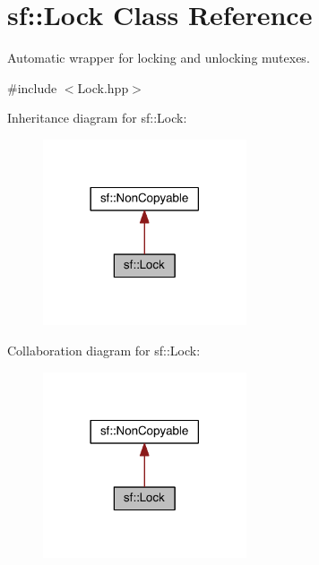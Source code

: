 \hypertarget{classsf_1_1_lock}{\section{sf\-:\-:Lock Class Reference}
\label{classsf_1_1_lock}
}


Automatic wrapper for locking and unlocking mutexes.  




{\ttfamily \#include $<$Lock.\-hpp$>$}



Inheritance diagram for sf\-:\-:Lock\-:
\nopagebreak
\begin{figure}[H]
\begin{center}
\leavevmode
\includegraphics[width=170pt]{classsf_1_1_lock__inherit__graph}
\end{center}
\end{figure}


Collaboration diagram for sf\-:\-:Lock\-:
\nopagebreak
\begin{figure}[H]
\begin{center}
\leavevmode
\includegraphics[width=170pt]{classsf_1_1_lock__coll__graph}
\end{center}
\end{figure}

